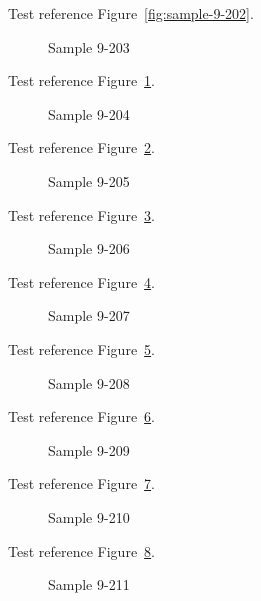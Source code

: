 Test reference Figure~\ref{fig:sample-9-202}.

\begin{figure}[tbhp]
\caption{Sample 9-203}
\label{fig:sample-9-203}
\end{figure}

Test reference Figure~\ref{fig:sample-9-203}.

\begin{figure}[tbhp]
\caption{Sample 9-204}
\label{fig:sample-9-204}
\end{figure}

Test reference Figure~\ref{fig:sample-9-204}.

\begin{figure}[tbhp]
\caption{Sample 9-205}
\label{fig:sample-9-205}
\end{figure}

Test reference Figure~\ref{fig:sample-9-205}.

\begin{figure}[tbhp]
\caption{Sample 9-206}
\label{fig:sample-9-206}
\end{figure}

Test reference Figure~\ref{fig:sample-9-206}.

\begin{figure}[tbhp]
\caption{Sample 9-207}
\label{fig:sample-9-207}
\end{figure}

Test reference Figure~\ref{fig:sample-9-207}.

\begin{figure}[tbhp]
\caption{Sample 9-208}
\label{fig:sample-9-208}
\end{figure}

Test reference Figure~\ref{fig:sample-9-208}.

\begin{figure}[tbhp]
\caption{Sample 9-209}
\label{fig:sample-9-209}
\end{figure}

Test reference Figure~\ref{fig:sample-9-209}.

\begin{figure}[tbhp]
\caption{Sample 9-210}
\label{fig:sample-9-210}
\end{figure}

Test reference Figure~\ref{fig:sample-9-210}.

\begin{figure}[tbhp]
\caption{Sample 9-211}
\label{fig:sample-9-211}
\end{figure}

